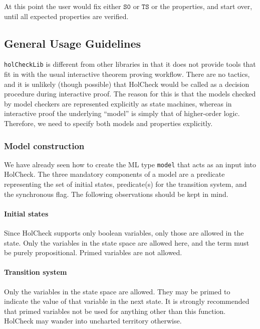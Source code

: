 \documentclass[12pt,fleqn]{article}
\newcommand{\hc}{HolCheck}
\begin{document}
At this point the user would fix either \(\mathtt{S0}\) or \(\mathtt{TS}\) or the properties, and start over, until all expected properties are verified.

\subsection{General Usage Guidelines}

\texttt{holCheckLib} is different from other libraries in that it does not provide tools that fit in with the usual interactive theorem proving workflow. There are no tactics, and it is unlikely (though possible) that \hc{} would be called as a decision procedure during interactive proof. The reason for this is that the models checked by model checkers are represented explicitly as state machines, whereas in \HOL{} interactive proof the underlying ``model'' is simply that of higher-order logic.  Therefore, we need to specify both models and properties explicitly.

\subsubsection{Model construction}\label{sec:models}

We have already seen how to create the ML type \texttt{model} that acts as an input into \hc{}. The three mandatory components of a model are a predicate representing the set of initial states, predicate(s) for the transition system, and the synchronous flag. The following observations should be kept in mind.

\paragraph{Initial states}

Since \hc{} supports only boolean variables, only those are allowed in the state. Only the variables in the state space are allowed here, and the term must be purely propositional. Primed variables are not allowed.

\paragraph{Transition system}

Only the variables in the state space are allowed. They may be primed to indicate the value of that variable in the next state. It is strongly recommended that primed variables not be used for anything other than this function. \hc{} may wander into uncharted territory otherwise.
\end{document}
